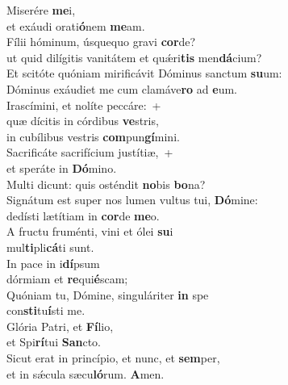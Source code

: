\evenverse Miserére \textbf{me}i,~\*\\
\evenverse et exáudi orati\textbf{ó}nem \textbf{me}am.\\
\oddverse Fílii hóminum, úsquequo gravi \textbf{cor}de?~\*\\
\oddverse ut quid dilígitis vanitátem et quǽri\textbf{tis} men\textbf{dá}cium?\\
\evenverse Et scitóte quóniam mirificávit Dóminus sanctum \textbf{su}um:~\*\\
\evenverse Dóminus exáudiet me cum clamáve\textbf{ro} ad \textbf{e}um.\\
\oddverse Irascímini, et nolíte peccáre:~+\\
\oddverse  quæ dícitis in córdibus \textbf{ve}stris,~\*\\
\oddverse in cubílibus vestris \textbf{com}pun\textbf{gí}mini.\\
\evenverse Sacrificáte sacrifícium justítiæ,~+\\
\evenverse  et speráte in \textbf{Dó}mino.~\*\\
\evenverse Multi dicunt: quis osténdit \textbf{no}bis \textbf{bo}na?\\
\oddverse Signátum est super nos lumen vultus tui, \textbf{Dó}mine:~\*\\
\oddverse dedísti lætítiam in \textbf{cor}de \textbf{me}o.\\
\evenverse A fructu fruménti, vini et ólei \textbf{su}i~\*\\
\evenverse mul\textbf{ti}pli\textbf{cá}ti sunt.\\
\oddverse In pace in i\textbf{dí}psum~\*\\
\oddverse dórmiam et \textbf{re}qui\textbf{é}scam;\\
\evenverse Quóniam tu, Dómine, singuláriter \textbf{in} spe~\*\\
\evenverse con\textbf{sti}tu\textbf{í}sti me.\\
\oddverse Glória Patri, et \textbf{Fí}lio,~\*\\
\oddverse et Spi\textbf{rí}tui \textbf{San}cto.\\
\evenverse Sicut erat in princípio, et nunc, et \textbf{sem}per,~\*\\
\evenverse et in sǽcula sæcu\textbf{ló}rum. \textbf{A}men.\\
